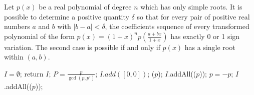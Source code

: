  \begin{comment}
A modern version of the algorithm has been invented by \cite{collin76}. The original method  firstly map all the positive real roots in $(0,1)$, then use bisection strategy and show
that if transformations $H_{\frac{1}{2}}$ and $H_{\frac{1}{2}}T$ are applied iteratively on any square-free polynomial $P$, one obtain, after a finite number of transformations,
a polynomial $Q$ such that $V(Q)\le 1$. \cite{akr80} modify the subdivision strategy, simply say, it recursion  computer the lower bound $b$ of positive real roots and shift
$x\leftarrow x+b$, then  first search the real roots in interval $(0,1]$ later in interval $(1,+\infty)$. Until all the positive real roots been found.

The correctness of all the algorithms are based on Theorem  \ref{thm:des}. The proof of the termination and complexity computation of their algorithms is base on the following theorems:
\end{comment}



\begin{theorem}\label{thm:vin}
  Let $p(x)$ be a real polynomial of degree $n$ which has only simple roots. It is possible to determine a positive quantity $\delta$ so that for every pair of positive real numbers $a$ and $b$ with $|b-a| < \delta$, the coefficients sequence of every transformed polynomial of the form
  $  p(x) = (1+x)^{n}p(\frac{a+bx}{1+x}) $
		  has exactly 0 or 1 sign variation. The second case is possible if and only if $p(x)$ has a single root within $(a,b)$.
\end{theorem}

\begin{algorithm}
\caption{\algm}
\DontPrintSemicolon
{}
$I=\emptyset$; \;
 {return $I$;}
$P=\frac{p}{\gcd(p,p')}$; 
 { $I.add([0,0])$; 
\dec($p$);  }
$I$.addAll(\algcf($p$)); \;
 
$p=-p$;\;
$I$.addAll(\algcf($p$)); %
\label{alg:main}
\end{algorithm}

